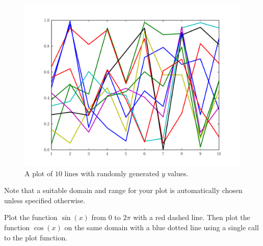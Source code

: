 \begin{figure}
\includegraphics[width=\textwidth]{statemachine.pdf}
\caption{A plot of $10$ lines with randomly generated $y$ values.}
\label{mpl:statemachineexample} 
\end{figure}

Note that a suitable domain and range for your plot is automatically chosen 
unless specified otherwise. 

\begin{problem} Plot the function $\sin(x)$ from $0$ to $2\pi$ with a red dashed 
line. Then plot the function $\cos(x)$ on the same domain with a blue dotted line 
using a single call to the plot function. 
\end{problem}


